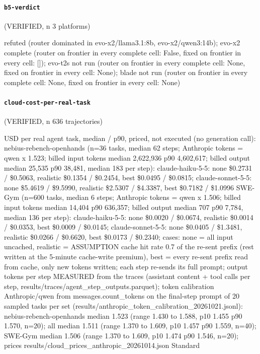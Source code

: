 \paragraph{\texttt{b5-verdict}} (VERIFIED, n 3 platforms)

{\footnotesize\raggedright refuted (router dominated in evo-x2/llama3.1:8b, evo-x2/qwen3:14b); evo-x2 complete (router on frontier in every complete cell: False, fixed on frontier in every cell: []); evo-t2s not run (router on frontier in every complete cell: None, fixed on frontier in every cell: None); blade not run (router on frontier in every complete cell: None, fixed on frontier in every cell: None)\par}

\paragraph{\texttt{cloud-cost-per-real-task}} (VERIFIED, n 636 trajectories)

{\footnotesize\raggedright USD per real agent task, median / p90, priced, not executed (no generation call): nebius-rebench-openhands (n=36 tasks, median 62 steps; Anthropic tokens = qwen x 1.523; billed input tokens median 2,622,936 p90 4,602,617; billed output median 25,535 p90 38,481, median 183 per step): claude-haiku-5-5: none \$0.2731 / \$0.5063, realistic \$0.1354 / \$0.2454, best \$0.0495 / \$0.0815; claude-sonnet-5-5: none \$5.4619 / \$9.5990, realistic \$2.5307 / \$4.3387, best \$0.7182 / \$1.0996 \textbar{} SWE-Gym (n=600 tasks, median 6 steps; Anthropic tokens = qwen x 1.506; billed input tokens median 14,404 p90 636,357; billed output median 707 p90 7,784, median 136 per step): claude-haiku-5-5: none \$0.0020 / \$0.0674, realistic \$0.0014 / \$0.0353, best \$0.0009 / \$0.0145; claude-sonnet-5-5: none \$0.0405 / \$1.3481, realistic \$0.0266 / \$0.6620, best \$0.0173 / \$0.2340; cases: none = all input uncached, realistic = ASSUMPTION cache hit rate 0.7 of the re-sent prefix (rest written at the 5-minute cache-write premium), best = every re-sent prefix read from cache, only new tokens written; each step re-sends its full prompt; output tokens per step MEASURED from the traces (assistant content + tool calls per step, results/traces/agent\_step\_outputs.parquet); token calibration Anthropic/qwen from messages.count\_tokens on the final-step prompt of 20 sampled tasks per set (results/anthropic\_token\_calibration\_20261021.jsonl): nebius-rebench-openhands median 1.523 (range 1.430 to 1.588, p10 1.455 p90 1.570, n=20); all median 1.511 (range 1.370 to 1.609, p10 1.457 p90 1.559, n=40); SWE-Gym median 1.506 (range 1.370 to 1.609, p10 1.474 p90 1.546, n=20); prices results/cloud\_prices\_anthropic\_20261014.json Standard\par}

